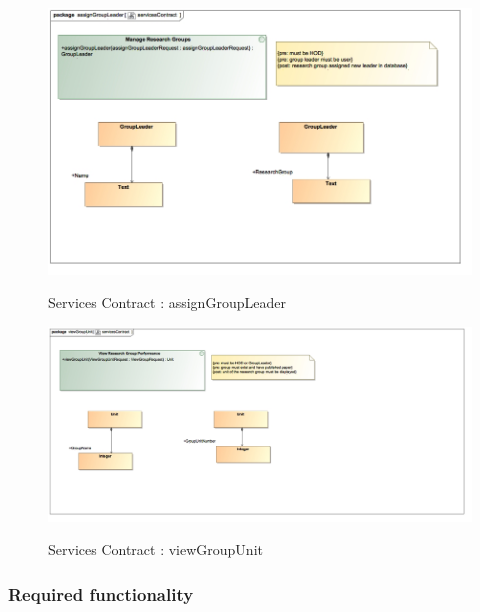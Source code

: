 \documentclass{article}
\begin{document}
		\begin{figure}[H]
			\includegraphics[width=\textwidth]{Vuyani_Diagrams/servicesContractAssignGroupLeader.jpg}  \\
			\caption{Services Contract : assignGroupLeader}
		\end{figure}
		\begin{figure}[H]
			\includegraphics[width=\textwidth]{Vuyani_Diagrams/servicesContractViewgroupUnit.jpg}  \\
			\caption{Services Contract : viewGroupUnit}
		\end{figure}

	\subsubsection{Required functionality}
	
\end{document}
